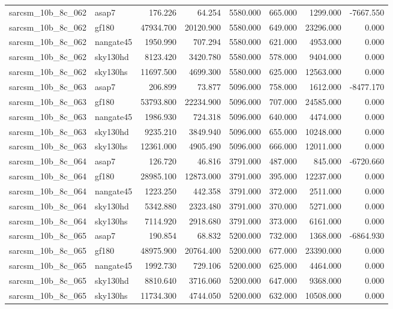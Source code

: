 \begin{tabular}{llrrrrrr}
sarcsm\_10b\_8c\_062 & asap7 & 176.226 & 64.254 & 5580.000 & 665.000 & 1299.000 & -7667.550 \\
sarcsm\_10b\_8c\_062 & gf180 & 47934.700 & 20120.900 & 5580.000 & 649.000 & 23296.000 & 0.000 \\
sarcsm\_10b\_8c\_062 & nangate45 & 1950.990 & 707.294 & 5580.000 & 621.000 & 4953.000 & 0.000 \\
sarcsm\_10b\_8c\_062 & sky130hd & 8123.420 & 3420.780 & 5580.000 & 578.000 & 9404.000 & 0.000 \\
sarcsm\_10b\_8c\_062 & sky130hs & 11697.500 & 4699.300 & 5580.000 & 625.000 & 12563.000 & 0.000 \\
sarcsm\_10b\_8c\_063 & asap7 & 206.899 & 73.877 & 5096.000 & 758.000 & 1612.000 & -8477.170 \\
sarcsm\_10b\_8c\_063 & gf180 & 53793.800 & 22234.900 & 5096.000 & 707.000 & 24585.000 & 0.000 \\
sarcsm\_10b\_8c\_063 & nangate45 & 1986.930 & 724.318 & 5096.000 & 640.000 & 4474.000 & 0.000 \\
sarcsm\_10b\_8c\_063 & sky130hd & 9235.210 & 3849.940 & 5096.000 & 655.000 & 10248.000 & 0.000 \\
sarcsm\_10b\_8c\_063 & sky130hs & 12361.000 & 4905.490 & 5096.000 & 666.000 & 12011.000 & 0.000 \\
sarcsm\_10b\_8c\_064 & asap7 & 126.720 & 46.816 & 3791.000 & 487.000 & 845.000 & -6720.660 \\
sarcsm\_10b\_8c\_064 & gf180 & 28985.100 & 12873.000 & 3791.000 & 395.000 & 12237.000 & 0.000 \\
sarcsm\_10b\_8c\_064 & nangate45 & 1223.250 & 442.358 & 3791.000 & 372.000 & 2511.000 & 0.000 \\
sarcsm\_10b\_8c\_064 & sky130hd & 5342.880 & 2323.480 & 3791.000 & 370.000 & 5271.000 & 0.000 \\
sarcsm\_10b\_8c\_064 & sky130hs & 7114.920 & 2918.680 & 3791.000 & 373.000 & 6161.000 & 0.000 \\
sarcsm\_10b\_8c\_065 & asap7 & 190.854 & 68.832 & 5200.000 & 732.000 & 1368.000 & -6864.930 \\
sarcsm\_10b\_8c\_065 & gf180 & 48975.900 & 20764.400 & 5200.000 & 677.000 & 23390.000 & 0.000 \\
sarcsm\_10b\_8c\_065 & nangate45 & 1992.730 & 729.106 & 5200.000 & 625.000 & 4464.000 & 0.000 \\
sarcsm\_10b\_8c\_065 & sky130hd & 8810.640 & 3716.060 & 5200.000 & 647.000 & 9368.000 & 0.000 \\
sarcsm\_10b\_8c\_065 & sky130hs & 11734.300 & 4744.050 & 5200.000 & 632.000 & 10508.000 & 0.000 \\

\end{tabular}
